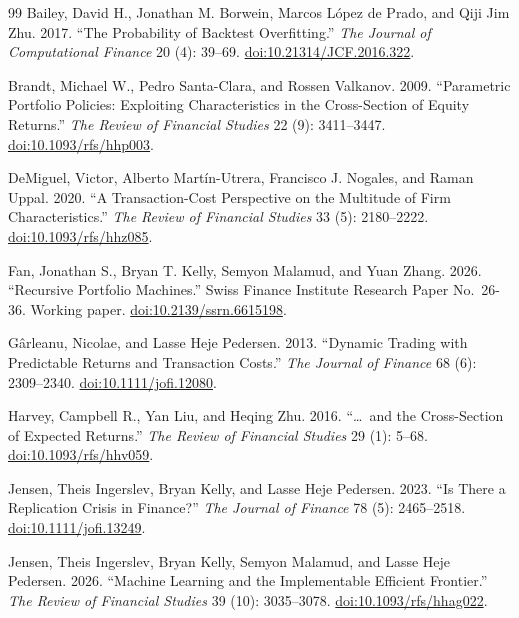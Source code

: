 \documentclass[12pt,letterpaper,fleqn]{article}
\begin{document}
\FloatBarrier
\clearpage
\begin{thebibliography}{99}
\setlength{\itemsep}{5pt}
Bailey, David H., Jonathan M. Borwein, Marcos L\'{o}pez de Prado, and Qiji Jim Zhu. 2017.
``The Probability of Backtest Overfitting.''
\textit{The Journal of Computational Finance} 20 (4): 39--69.
\href{https://doi.org/10.21314/JCF.2016.322}{doi:10.21314/JCF.2016.322}.

Brandt, Michael W., Pedro Santa-Clara, and Rossen Valkanov. 2009.
``Parametric Portfolio Policies: Exploiting Characteristics in the Cross-Section of Equity Returns.''
\textit{The Review of Financial Studies} 22 (9): 3411--3447.
\href{https://doi.org/10.1093/rfs/hhp003}{doi:10.1093/rfs/hhp003}.

DeMiguel, Victor, Alberto Mart\'{i}n-Utrera, Francisco J. Nogales, and Raman Uppal. 2020.
``A Transaction-Cost Perspective on the Multitude of Firm Characteristics.''
\textit{The Review of Financial Studies} 33 (5): 2180--2222.
\href{https://doi.org/10.1093/rfs/hhz085}{doi:10.1093/rfs/hhz085}.

Fan, Jonathan S., Bryan T. Kelly, Semyon Malamud, and Yuan Zhang. 2026.
``Recursive Portfolio Machines.''
Swiss Finance Institute Research Paper No.~26-36. Working paper.
\href{https://doi.org/10.2139/ssrn.6615198}{doi:10.2139/ssrn.6615198}.

G\^{a}rleanu, Nicolae, and Lasse Heje Pedersen. 2013.
``Dynamic Trading with Predictable Returns and Transaction Costs.''
\textit{The Journal of Finance} 68 (6): 2309--2340.
\href{https://doi.org/10.1111/jofi.12080}{doi:10.1111/jofi.12080}.

Harvey, Campbell R., Yan Liu, and Heqing Zhu. 2016.
``\ldots\ and the Cross-Section of Expected Returns.''
\textit{The Review of Financial Studies} 29 (1): 5--68.
\href{https://doi.org/10.1093/rfs/hhv059}{doi:10.1093/rfs/hhv059}.

Jensen, Theis Ingerslev, Bryan Kelly, and Lasse Heje Pedersen. 2023.
``Is There a Replication Crisis in Finance?''
\textit{The Journal of Finance} 78 (5): 2465--2518.
\href{https://doi.org/10.1111/jofi.13249}{doi:10.1111/jofi.13249}.

Jensen, Theis Ingerslev, Bryan Kelly, Semyon Malamud, and Lasse Heje Pedersen. 2026.
``Machine Learning and the Implementable Efficient Frontier.''
\textit{The Review of Financial Studies} 39 (10): 3035--3078.
\href{https://doi.org/10.1093/rfs/hhag022}{doi:10.1093/rfs/hhag022}.


\end{thebibliography}
\end{document}
